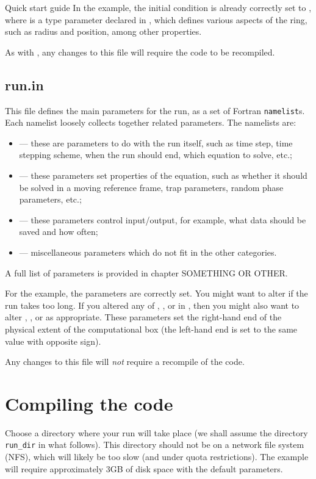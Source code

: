 \begin{chapter}{\label{cha:quickstart} Quick start guide}
  In the  example, the initial condition is already correctly
  set to , where  is a type parameter
  declared in , which defines various aspects of the
  ring, such as radius and position, among other properties.

  As with , any changes to this file will require the
  code to be recompiled.

  \subsection{\label{subsec:runin}run.in}
  This file defines the main parameters for the run, as a set of Fortran
  \verb"namelist"s.  Each namelist loosely collects together related
  parameters.  The namelists are:
  \begin{itemize}
    \item {} --- these are parameters to do with the run
      itself, such as time step, time stepping scheme, when the run should end,
      which equation to solve, etc.;
    \item {} --- these parameters set properties of the
      equation, such as whether it should be solved in a moving reference
      frame, trap parameters, random phase parameters, etc.;
    \item {} --- these parameters control input/output, for
      example, what data should be saved and how often;
    \item {} --- miscellaneous parameters which do not fit
      in the other categories.
  \end{itemize}
  A full list of parameters is provided in chapter SOMETHING OR OTHER.

  For the  example, the parameters are correctly set.  You
  might want to alter  if the run takes too long.  If you
  altered any of , , or  in
  , then you might also want to alter ,
  , or  as appropriate.  These parameters set the
  right-hand end of the physical extent of the computational box (the left-hand
  end is set to the same value with opposite sign).

  Any changes to this file will \emph{not} require a recompile of the code.

  \section{Compiling the code}
  Choose a directory where your run will take place (we shall assume the
  directory \verb"run_dir" in what follows).  This directory should not be on a
  network file system (NFS), which will likely be too slow (and under quota
  restrictions).  The  example will require approximately 3GB
  of disk space with the default parameters.


\end{chapter}

